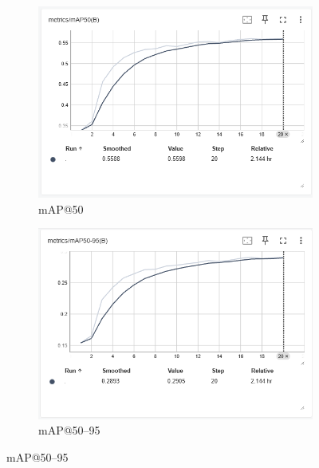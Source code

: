 \begin{figure}[H]
	\centering
	\begin{subfigure}[b]{0.48\textwidth}
		\includegraphics[width=\textwidth]{figures/chapter4/map50.png}
		\caption{mAP@50}
	\end{subfigure}
	\hfill
	\begin{subfigure}[b]{0.48\textwidth}
		\includegraphics[width=\textwidth]{figures/chapter4/map5095.png}
		\caption{mAP@50--95}
	\end{subfigure}
	
	\vspace{1em}
	

\end{figure}
